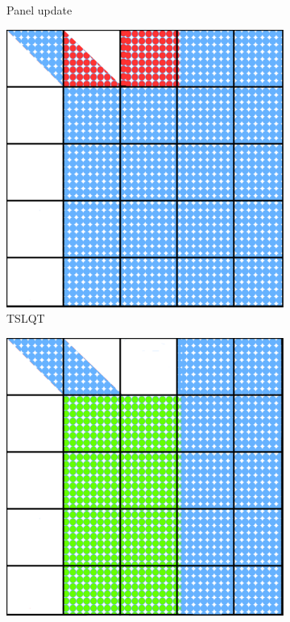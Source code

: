 \begin{figure}[h!]
\begin{subfigure}{0.2 \textwidth}
      \caption{\label{fig:tile_lq_update_2}Panel update}
  \end{subfigure}
  \hfill
  \begin{subfigure}{0.2 \textwidth}
    \includegraphics[width=\textwidth]{fig/SVD_tile_9_grid}
    \caption{\label{fig:tile_lq_update_2}TSLQT}
  \end{subfigure}
  \hfill
  \begin{subfigure}{0.2 \textwidth}
    \includegraphics[width=\textwidth]{fig/SVD_tile_10_grid}

\end{subfigure}
\end{figure}
